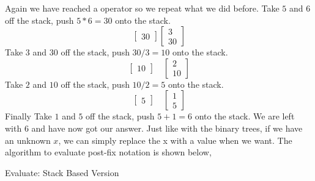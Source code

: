 \documentclass{report}
\begin{document}
Again we have reached a operator so we repeat what we did before. Take $5$ and $6$ off the stack, push $5*6 = 30$ onto the stack.
\[\begin{bmatrix} 30 \end{bmatrix}
\begin{bmatrix} 3 \\ 30\end{bmatrix}\]
Take $3$ and $30$ off the stack, push $30 / 3 = 10$ onto the stack.
\[\begin{bmatrix} 10 \end{bmatrix} \quad
\begin{bmatrix} 2 \\ 10 \end{bmatrix}\]
Take $2$ and $10$ off the stack, push $10/2 = 5$ onto the stack.
\[\begin{bmatrix} 5 \end{bmatrix} \quad
\begin{bmatrix} 1 \\ 5 \end{bmatrix}\]
Finally Take $1$ and $5$ off the stack, push $5 + 1 = 6$ onto the stack. We are left with 6 and have now got our answer. Just like with the binary trees, if we have an unknown $x$, we can simply replace the x with a value when we want. The algorithm to evaluate post-fix notation is shown below,\\
\begin{algorithm}[H]
\DontPrintSemicolon
\caption{Evaluate: Stack Based Version}
\end{algorithm}
\end{document}
